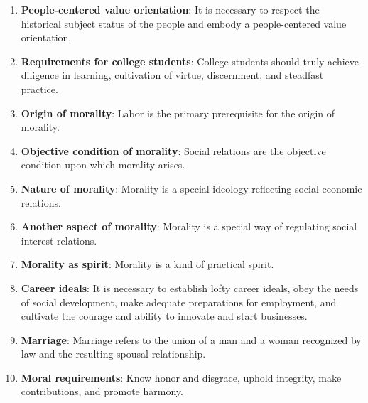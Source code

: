 \documentclass[11pt,a4paper]{ctexart}
\begin{document}
\begin{enumerate}[leftmargin=2em]
    \item \textbf{People-centered value orientation}: It is necessary to respect the historical subject status of the people and embody a people-centered value orientation.
    \item \textbf{Requirements for college students}: College students should truly achieve diligence in learning, cultivation of virtue, discernment, and steadfast practice.
    \item \textbf{Origin of morality}: Labor is the primary prerequisite for the origin of morality.
    \item \textbf{Objective condition of morality}: Social relations are the objective condition upon which morality arises.
    \item \textbf{Nature of morality}: Morality is a special ideology reflecting social economic relations.
    \item \textbf{Another aspect of morality}: Morality is a special way of regulating social interest relations.
    \item \textbf{Morality as spirit}: Morality is a kind of practical spirit.
    \item \textbf{Career ideals}: It is necessary to establish lofty career ideals, obey the needs of social development, make adequate preparations for employment, and cultivate the courage and ability to innovate and start businesses.
    \item \textbf{Marriage}: Marriage refers to the union of a man and a woman recognized by law and the resulting spousal relationship.
    \item \textbf{Moral requirements}: Know honor and disgrace, uphold integrity, make contributions, and promote harmony.
\end{enumerate}
\end{document}
